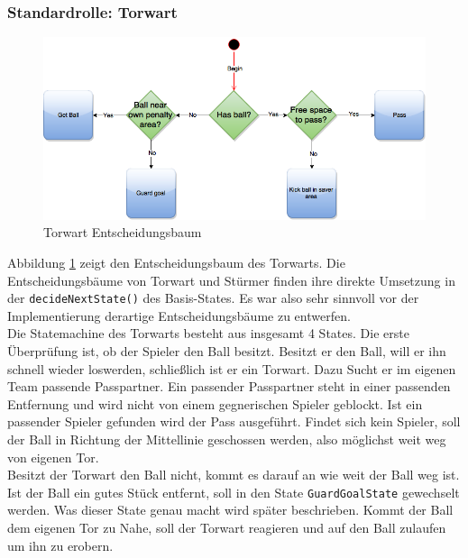 \documentclass[fontsize=12pt,a4paper,final]{scrartcl}[2003/01/01]
\makeatletter
\def\ScaleIfNeeded{%
	\ifdim\Gin@nat@width>\linewidth
		\linewidth
	\else
		\Gin@nat@width
	\fi
}
\makeatother
\begin{document}
\subsubsection{Standardrolle: Torwart}

\begin{figure}[H]
	\centering
	\includegraphics[width=\ScaleIfNeeded]{Grafiken/KI/Keeper}
	\caption{Torwart Entscheidungsbaum}
	\label{Torwart Entscheidungsbaum}
\end{figure}

Abbildung \ref{Torwart Entscheidungsbaum} zeigt den Entscheidungsbaum des Torwarts. Die Entscheidungsbäume von Torwart und Stürmer finden ihre direkte Umsetzung in der \lstinline$decideNextState()$ des Basis-States. Es war also sehr sinnvoll vor der Implementierung derartige Entscheidungsbäume zu entwerfen.
\\

Die Statemachine des Torwarts besteht aus insgesamt 4 States. Die erste Überprüfung ist, ob der Spieler den Ball besitzt. Besitzt er den Ball, will er ihn schnell wieder loswerden, schließlich ist er ein Torwart. Dazu Sucht er im eigenen Team passende Passpartner. Ein passender Passpartner steht in einer passenden Entfernung und wird nicht von einem gegnerischen Spieler geblockt. Ist ein passender Spieler gefunden wird der Pass ausgeführt. Findet sich kein Spieler, soll der Ball in Richtung der Mittellinie geschossen werden, also möglichst weit weg von eigenen Tor.
\\

Besitzt der Torwart den Ball nicht, kommt es darauf an wie weit der Ball weg ist. Ist der Ball ein gutes Stück entfernt, soll in den State \lstinline$GuardGoalState$ gewechselt werden. Was dieser State genau macht wird später beschrieben. Kommt der Ball dem eigenen Tor zu Nahe, soll der Torwart reagieren und auf den Ball zulaufen um ihn zu erobern.
\\
\end{document}
